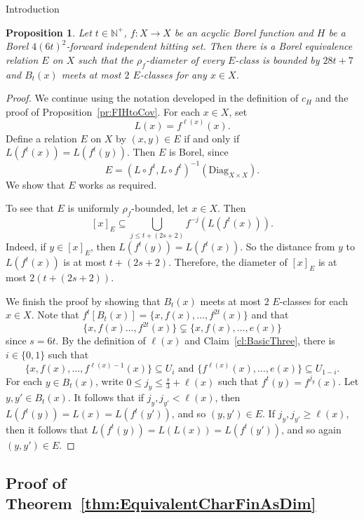 \documentclass[psamsfonts]{amsart}
\newtheorem{prop}[thm]{Proposition}
\theoremstyle{definition}
\newcommand{\N}{\mathbb N}
\theoremstyle{remark}
\numberwithin{equation}{section}
\begin{document}
\begin{section}{Introduction}
    \begin{prop}\label{pr:HittingToEqRel}
        Let $t\in \N^+$, $f:X\to X$ be an acyclic Borel function and $H$ be a Borel $4(6t)^2$-forward independent hitting set.
        Then there is a Borel equivalence relation $E$ on $X$ such that the $\rho_f$-diameter of every $E$-class is bounded by $28t+7$ and $B_t(x)$ meets at most $2$ $E$-classes for any $x \in X$.
    \end{prop}

    \begin{proof}
        We continue using the notation developed in the definition of $c_H$ and the proof of Proposition~\ref{pr:FIHtoCov}.
        For each $x \in X$, set
        $$L(x) = f^{\ell(x)}(x).$$
        Define a relation $E$ on $X$ by $(x,y)\in E$ if and only if $L(f^t(x)) = L(f^t(y))$.
        Then $E$ is Borel, since
        $$E = (L \circ f^t, L \circ f^t)^{-1}(\text{Diag}_{X\times X}).$$
        We show that $E$ works as required.
        
        To see that $E$ is uniformly $\rho_f$-bounded, let $x \in X$. Then
        $$[x]_E \subseteq \bigcup_{j \leq t + (2s + 2)} f^{-j}(L(f^t(x))).$$
        Indeed, if $y \in [x]_E$, then $L(f^t(y)) = L(f^t(x))$. So the distance from $y$ to $L(f^t(x))$ is at most $t + (2s + 2)$. Therefore, the diameter of $[x]_E$ is at most $2(t + (2s + 2))$.

        We finish the proof by showing that $B_t(x)$ meets at most $2$ $E$-classes for each $x \in X$.
        Note that $f^t[B_t(x)] = \{x, f(x), \dots, f^{2t}(x) \}$ and that
        $$\{x, f(x) \dots, f^{2t}(x) \} \subsetneq \{x, f(x), \dots, e(x) \}$$
        since $s=6t$.
        By the definition of $\ell(x)$ and Claim~\ref{cl:BasicThree}, there is $i\in \{0,1\}$ such that
        $$\{x, f(x), \dots, f^{\ell(x) - 1}(x) \}\subseteq U_i\text{ and }\{f^{\ell(x)}(x), \dots, e(x) \}\subseteq U_{1-i}.$$
        For each $y \in B_t(x)$, write $0\le j_y\le \frac{s}{3} + \ell(x)$ such that $f^t(y)=f^{j_y}(x)$.
        Let $y,y'\in B_t(x)$.
        It follows that if $j_y,j_{y'}< \ell(x)$, then $L(f^t(y))=L(x)=L(f^t(y'))$, and so $(y,y')\in E$.
        If $j_y,j_{y'}\ge \ell(x)$, then it follows that $L(f^t(y))=L(L(x))=L(f^t(y'))$, and so again $(y,y')\in E$.
    \end{proof}


    \subsection{Proof of Theorem~\ref{thm:EquivalentCharFinAsDim}}
    \label{subsec:AsdimEquiv}


\end{section}
\end{document}
